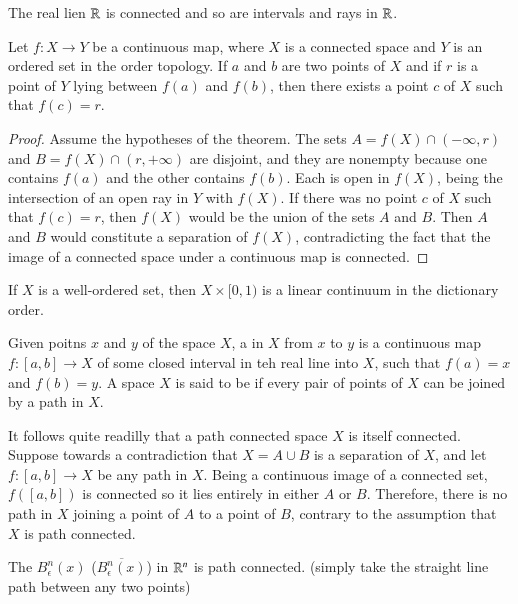 \documentclass[12pt, a4paper, oneside, openright, titlepage]{book}
\begin{document}
\begin{cor}
    The real lien $\mathbb R$ is connected and so are intervals and rays in $\mathbb R$.
\end{cor}


\begin{namthm}\label{thmname:intvalgen}
    Let $f:X\rightarrow Y$ be a continuous map, where $X$ is a connected space and $Y$ is an ordered set in the order topology. If $a$ and $b$ are two points of $X$ and if $r$ is a point of $Y$ lying between $f(a)$ and $f(b)$, then there exists a point $c$ of $X$ such that $f(c) = r$.
\end{namthm}
\begin{proof}
    Assume the hypotheses of the theorem. The sets $A = f(X)\cap (-\infty, r)$ and $B = f(X)\cap(r,+\infty)$ are disjoint, and they are nonempty because one contains $f(a)$ and the other contains $f(b)$. Each is open in $f(X)$, being the intersection of an open ray in $Y$ with $f(X)$. If there was no point $c$ of $X$ such that $f(c) = r$, then $f(X)$ would be the union of the sets $A$ and $B$. Then $A$ and $B$ would constitute a separation of $f(X)$, contradicting the fact that the image of a connected space under a continuous map is connected.
\end{proof}

\begin{eg}
    If $X$ is a well-ordered set, then $X\times [0,1)$ is a linear continuum in the dictionary order.
\end{eg}

\begin{defn}
    Given poitns $x$ and $y$ of the space $X$, a  in $X$ from $x$ to $y$ is a continuous map $f:[a,b]\rightarrow X$ of some closed interval in teh real line into $X$, such that $f(a) = x$ and $f(b) = y$. A space $X$ is said to be  if every pair of points of $X$ can be joined by a path in $X$.
\end{defn}

It follows quite readilly that a path connected space $X$ is itself connected. Suppose towards a contradiction that $X = A\cup B$ is a separation of $X$, and let $f:[a,b]\rightarrow X$ be any path in $X$. Being a continuous image of a connected set, $f([a,b])$ is connected so it lies entirely in either $A$ or $B$. Therefore, there is no path in $X$ joining a point of $A$ to a point of $B$, contrary to the assumption that $X$ is path connected.

\begin{eg}
    The  $B^n_{\epsilon}(x)$ ($\overline{B^n_{\epsilon}(x)}$) in $\mathbb R^n$ is path connected. (simply take the straight line path between any two points)
\end{eg}
\end{document}
